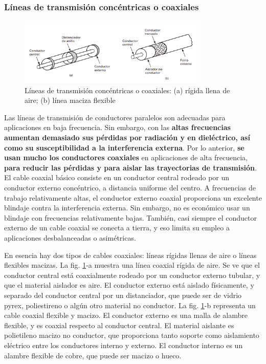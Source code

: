         \subsubsection{Líneas de transmisión concéntricas o coaxiales}

            \begin{figure}[H]
                \centering
                \includegraphics[width=0.8\textwidth]{imagenes/coaxiales.png}
                \caption{Líneas de transmisión concéntricas o coaxiales: (a) rígida llena de aire; (b) línea maciza flexible}
                \label{fig:coaxiales}
            \end{figure}

            Las líneas de transmisión de conductores paralelos son adecuadas para aplicaciones en baja frecuencia. Sin embargo, con las\textbf{ altas frecuencias aumentan demasiado sus pérdidas por radiación y en dieléctrico, así como su susceptibilidad a la interferencia externa}. Por lo anterior, \textbf{se usan mucho los conductores coaxiales} en aplicaciones de alta frecuencia, \textbf{para reducir las pérdidas y para aislar las trayectorias de transmisión}. El cable coaxial básico consiste en un conductor central rodeado por un conductor externo concéntrico, a distancia uniforme del centro. A frecuencias de trabajo relativamente altas, el conductor externo coaxial proporciona un excelente blindaje contra la interferencia externa. Sin embargo, no es económico usar un blindaje con frecuencias relativamente bajas. También, casi siempre el conductor externo de un cable coaxial se conecta a tierra, y eso limita su empleo a aplicaciones desbalanceadas o asimétricas.

            En esencia hay dos tipos de cables coaxiales: líneas rígidas llenas de aire o líneas flexibles macizas. La fig. \ref{fig:coaxiales}-a muestra una línea coaxial rígida de aire. Se ve que el conductor central está coaxialmente rodeado por un conductor externo tubular, y que el material aislador es aire. El conductor externo está aislado físicamente, y separado del conductor central por un distanciador, que puede ser de vidrio pyrex, poliestireno o algún otro material no conductor. La fig. \ref{fig:coaxiales}-b representa un cable coaxial flexible y macizo. El conductor externo es una malla de alambre flexible, y es coaxial respecto al conductor central. El material aislante es polietileno macizo no conductor, que proporciona tanto soporte como aislamiento eléctrico entre los conductores interno y externo. El conductor interno es un alambre flexible de cobre, que puede ser macizo o hueco.

